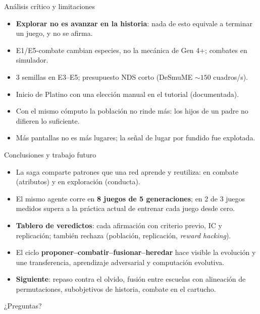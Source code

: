 \documentclass[aspectratio=169,11pt]{beamer}
\begin{document}
\begin{frame}{Análisis crítico y limitaciones}
\begin{itemize}
\item \textbf{Explorar no es avanzar en la historia}: nada de esto equivale a terminar un juego, y no se afirma.
\item E1/E5-combate cambian especies, no la mecánica de Gen 4+; combates en simulador.
\item 3 semillas en E3--E5; presupuesto NDS corto (DeSmuME ${\sim}150$ cuadros/s).
\item Inicio de Platino con una elección manual en el tutorial (documentada).
\item Con el mismo cómputo la población no rinde más: los hijos de un padre no difieren lo suficiente.
\item Más pantallas no es más lugares; la señal de lugar por fundido fue explotada.
\end{itemize}
\end{frame}

\begin{frame}{Conclusiones y trabajo futuro}
\begin{itemize}
\item La saga comparte patrones que una red aprende y reutiliza: en combate (atributos) y en exploración (conducta).
\item El mismo agente corre en \textbf{8 juegos de 5 generaciones}; en 2 de 3 juegos medidos supera a la práctica actual de entrenar cada juego desde cero.
\item \textbf{Tablero de veredictos}: cada afirmación con criterio previo, IC y replicación; también rechaza (población, replicación, \emph{reward hacking}).
\item El ciclo \textbf{proponer--combatir--fusionar--heredar} hace visible la evolución y une transferencia, aprendizaje adversarial y computación evolutiva.
\item \textbf{Siguiente}: repaso contra el olvido, fusión entre escuelas con alineación de permutaciones, subobjetivos de historia, combate en el cartucho.
\end{itemize}
\vspace{0.3cm}
\centering\large ¿Preguntas?
\end{frame}
\end{document}
